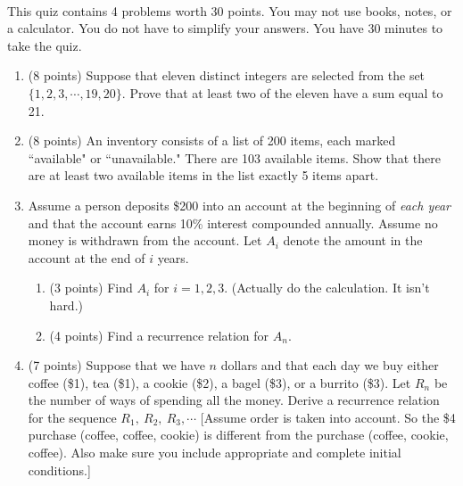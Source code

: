 \documentclass[12pt]{article}
\newcommand{\be}{\begin{enumerate}}
\newcommand{\ee}{\end{enumerate}}
\begin{document}
\thispagestyle{fancy}


\\

\noindent This quiz contains 4 problems worth 30 points. You may not use books, notes, or a calculator. You do not have to simplify your answers. You have 30 minutes to take the quiz.\\

\noindent\hrulefill

\be
\item (8 points) Suppose that eleven distinct integers are selected from the set $\{1,2,3,\cdots, 19,20\}.$ Prove that at least two of the eleven have a sum equal to 21.
\vfill
\item (8 points) An inventory consists of a list of 200 items, each marked ``available" or ``unavailable." There are 103 available items. Show that there are at least two available items in the list exactly 5 items apart.
\vfill
\newpage

\item Assume a person deposits \$200  into an account at the beginning of \emph{each year} and that the account earns 10\% interest compounded annually. Assume no money is withdrawn from the account. Let $A_i$ denote the amount in the account at the end of $i$ years.
\be
\item (3 points) Find $A_i$ for $i=1,2,3.$ (Actually do the calculation. It isn't hard.)
\vfill
\item (4 points) Find a recurrence relation for $A_n.$
\vspace{1in}
\ee
\item (7 points) Suppose that we have $n$ dollars and that each day we buy either coffee (\$1), tea (\$1), a cookie (\$2), a bagel (\$3), or a burrito (\$3). Let $R_n$ be the number of ways of spending all the money. Derive a recurrence relation for the sequence $R_1,\: R_2,\: R_3, \cdots$ [Assume order is taken into account. So the \$4 purchase (coffee, coffee, cookie) is different from the purchase (coffee, cookie, coffee). Also make sure you include appropriate and complete initial conditions.]
\vfill

\ee
\end{document}
